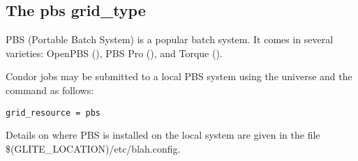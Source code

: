 
\subsection{\label{sec:PBS}The pbs grid\_type }

PBS (Portable Batch System) is a popular batch system. It comes in
several varieties: OpenPBS (),
PBS Pro (), and
Torque
().

Condor jobs may be submitted to a local PBS system
using the  universe and the
 command as follows:
\begin{verbatim}
grid_resource = pbs
\end{verbatim}

Details on where PBS is installed on the local system are
given in the file \$(GLITE\_LOCATION)/etc/blah.config.
